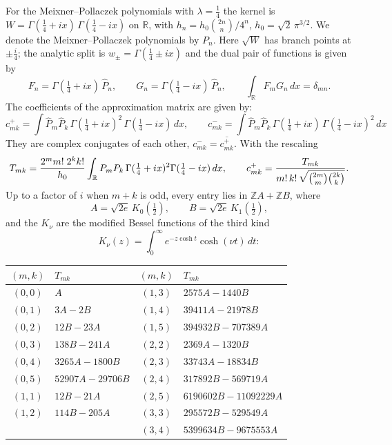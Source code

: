 \documentclass[11pt,a4paper]{article}
\theoremstyle{definition}
\newcommand{\R}{\mathbb{R}}
\newcommand{\Z}{\mathbb{Z}}
\newcommand{\G}{\Gamma}
\begin{document}
For the Meixner--Pollaczek polynomials with $\lambda = \tfrac14$ the
kernel is $W = \G(\tfrac14+ix)\,\G(\tfrac14-ix)$ on $\R$, with
$h_n = h_0 \binom{2n}{n}/4^n$, $h_0 = \sqrt2\, \pi^{3/2}$.
We denote the Meixner--Pollaczek polynomials by $P_n$.
Here $\sqrt W$ has branch points at
$\pm\tfrac{i}{4}$; the analytic split is $w_\pm = \G(\tfrac14 \pm ix)$
and the dual pair of functions is given by
\[
  F_n = \G(\tfrac14+ix)\,\widehat P_n, \qquad
  G_n = \G(\tfrac14-ix)\,\widehat P_n, \qquad
  \int_\R F_m G_n\, dx = \delta_{mn}.
\]
The coefficients of the approximation matrix are given by:
\[
  c^+_{mk} = \int \widehat P_m \widehat P_k\,
  \G(\tfrac14+ix)^2\,\G(\tfrac14-ix)\, dx, \qquad
  c^-_{mk} = \int \widehat P_m \widehat P_k\,
  \G(\tfrac14+ix)\,\G(\tfrac14-ix)^2\, dx
\]
They are complex conjugates of each other, $c^-_{mk} = \overline{c^+_{mk}}$.
With the rescaling
\[
  T_{mk} = \frac{2^m m!\; 2^k k!}{h_0}
  \int_\R P_m P_k\, \G(\tfrac14+ix)^2 \G(\tfrac14-ix)\, dx,
  \qquad
  c^+_{mk} = \frac{T_{mk}}{m!\,k!\,
  \sqrt{\smash[b]{\tbinom{2m}{m}\tbinom{2k}{k}}}} .
\]
Up to a factor of $i$ when $m+k$ is odd, every entry lies in
$\Z A + \Z B$, where
\[
  A = \sqrt{2e}\,K_0(\tfrac12), \qquad
  B = \sqrt{2e}\,K_1(\tfrac12),
\]
and the $K_\nu$ are the modified Bessel functions of the third kind
\[
  K_\nu(z) = \int_0^\infty e^{-z\cosh t} \cosh(\nu t)\, dt :
\]

\begin{tcolorbox}[colback=black!5, colframe=black!5, boxrule=0pt, sharp corners]
\begin{center}
\begin{tabular}{cl@{\qquad}cl}
\toprule
$(m,k)$ & $T_{mk}$ & $(m,k)$ & $T_{mk}$ \\
\midrule
$(0,0)$ & $A$                   & $(1,3)$ & $2575A - 1440B$ \\
$(0,1)$ & $3A - 2B$             & $(1,4)$ & $39411A - 21978B$ \\
$(0,2)$ & $12B - 23A$           & $(1,5)$ & $394932B - 707389A$ \\
$(0,3)$ & $138B - 241A$         & $(2,2)$ & $2369A - 1320B$ \\
$(0,4)$ & $3265A - 1800B$       & $(2,3)$ & $33743A - 18834B$ \\
$(0,5)$ & $52907A - 29706B$     & $(2,4)$ & $317892B - 569719A$ \\
$(1,1)$ & $12B - 21A$           & $(2,5)$ & $6190602B - 11092229A$ \\
$(1,2)$ & $114B - 205A$         & $(3,3)$ & $295572B - 529549A$ \\
        &                       & $(3,4)$ & $5399634B - 9675553A$ \\
\bottomrule
\end{tabular}
\end{center}
\end{tcolorbox}
\end{document}
